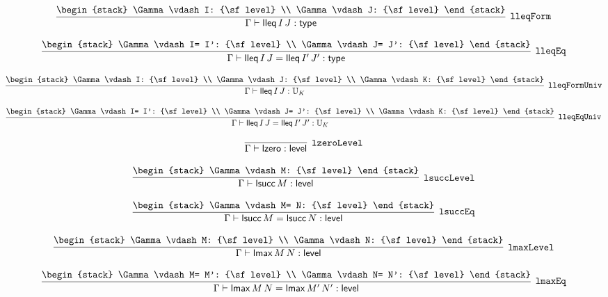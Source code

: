 \[
\infer[{\tt lleqForm}]{\Gamma \vdash {\sf lleq}\,I\,J: {\sf type}}{
\begin{stack}
\Gamma \vdash I: {\sf level}
\\
\Gamma \vdash J: {\sf level}
\end{stack}}
\]

\[
\infer[{\tt lleqEq}]{\Gamma \vdash {\sf lleq}\,I\,J= {\sf lleq}\,I'\,J': {\sf type}}{
\begin{stack}
\Gamma \vdash I= I': {\sf level}
\\
\Gamma \vdash J= J': {\sf level}
\end{stack}}
\]

\[
\infer[{\tt lleqFormUniv}]{\Gamma \vdash {\sf lleq}\,I\,J: {\Bbb U}_{K}}{
\begin{stack}
\Gamma \vdash I: {\sf level}
\\
\Gamma \vdash J: {\sf level}
\\
\Gamma \vdash K: {\sf level}
\end{stack}}
\]

\[
\infer[{\tt lleqEqUniv}]{\Gamma \vdash {\sf lleq}\,I\,J= {\sf lleq}\,I'\,J': {\Bbb U}_{K}}{
\begin{stack}
\Gamma \vdash I= I': {\sf level}
\\
\Gamma \vdash J= J': {\sf level}
\\
\Gamma \vdash K: {\sf level}
\end{stack}}
\]

\[
\infer[{\tt lzeroLevel}]{\Gamma \vdash {\sf lzero}: {\sf level}}{}
\]

\[
\infer[{\tt lsuccLevel}]{\Gamma \vdash {\sf lsucc}\,M: {\sf level}}{
\begin{stack}
\Gamma \vdash M: {\sf level}
\end{stack}}
\]

\[
\infer[{\tt lsuccEq}]{\Gamma \vdash {\sf lsucc}\,M= {\sf lsucc}\,N: {\sf level}}{
\begin{stack}
\Gamma \vdash M= N: {\sf level}
\end{stack}}
\]

\[
\infer[{\tt lmaxLevel}]{\Gamma \vdash {\sf lmax}\,M\,N: {\sf level}}{
\begin{stack}
\Gamma \vdash M: {\sf level}
\\
\Gamma \vdash N: {\sf level}
\end{stack}}
\]

\[
\infer[{\tt lmaxEq}]{\Gamma \vdash {\sf lmax}\,M\,N= {\sf lmax}\,M'\,N': {\sf level}}{
\begin{stack}
\Gamma \vdash M= M': {\sf level}
\\
\Gamma \vdash N= N': {\sf level}
\end{stack}}
\]

